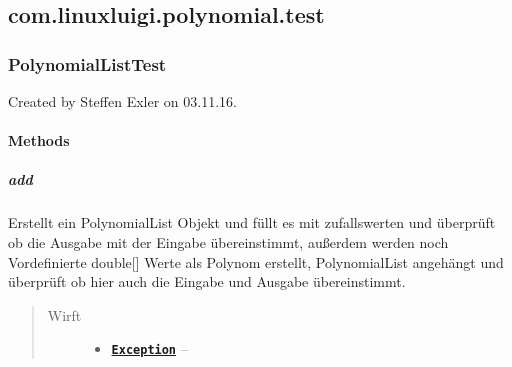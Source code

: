 \documentclass[letterpaper,10pt,ngerman]{sphinxmanual}
\begin{document}
\subsection{com.linuxluigi.polynomial.test}
\label{com/linuxluigi/polynomial/test/package-index:com-linuxluigi-polynomial-test}\label{com/linuxluigi/polynomial/test/package-index::doc}\label{com/linuxluigi/polynomial/test/package-index:package-com.linuxluigi.polynomial.test}

\subsubsection{PolynomialListTest}
\label{com/linuxluigi/polynomial/test/PolynomialListTest:polynomiallisttest}\label{com/linuxluigi/polynomial/test/PolynomialListTest::doc}

\begin{fulllineitems}
\label{com/linuxluigi/polynomial/test/PolynomialListTest:com.linuxluigi.polynomial.test.PolynomialListTest}
Created by Steffen Exler on 03.11.16.

\end{fulllineitems}



\paragraph{Methods}
\label{com/linuxluigi/polynomial/test/PolynomialListTest:methods}

\subparagraph{add}
\label{com/linuxluigi/polynomial/test/PolynomialListTest:add}

\begin{fulllineitems}
\label{com/linuxluigi/polynomial/test/PolynomialListTest:com.linuxluigi.polynomial.test.PolynomialListTest.add()}
Erstellt ein PolynomialList Objekt und füllt es mit zufallswerten und überprüft ob die Ausgabe mit der Eingabe übereinstimmt, außerdem werden noch Vordefinierte double{[}{]} Werte als Polynom erstellt, PolynomialList angehängt und überprüft ob hier auch die Eingabe und Ausgabe übereinstimmt.
\begin{quote}\begin{description}
\item[{Wirft}] \leavevmode\begin{itemize}
\item {} 
\href{http://docs.oracle.com/javase/8/docs/api/java/lang/Exception.html}{\textbf{\texttt{Exception}}} -- 

\end{itemize}

\end{description}\end{quote}

\end{fulllineitems}
\end{document}
